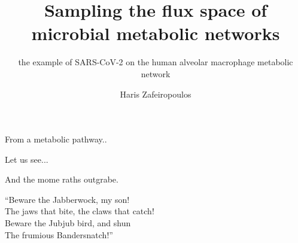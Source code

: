 \documentclass{beamer}
\title{Sampling the flux space of microbial metabolic networks
} %
\subtitle{the example of SARS-CoV-2 on the human alveolar macrophage metabolic network} %
\author{Haris Zafeiropoulos}
\begin{document}
   \shorthandoff{-}
   \frame[c]{\maketitle}





   \begin{frame}{From a metabolic pathway..}
      

      Let us see... 

      And the mome raths outgrabe.\\\bigskip

      “Beware the Jabberwock, my son!\\
      The jaws that bite, the claws that catch!\\
      Beware the Jubjub bird, and shun\\
      The frumious Bandersnatch!”\\
   \end{frame}

\end{document}

